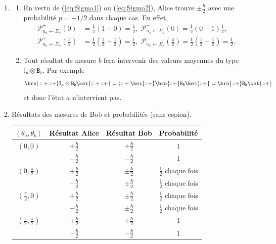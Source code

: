 \begin{enumerate}
\begin{enumerate}
\item 
\begin{enumerate}
 \item En vertu de (\ref{eq:Sigma1}) ou (\ref{eq:Sigma2}), Alice trouve
$\pm\frac{\hbar}{2}$ avec une probabilité $p=+1/2$ dans chaque cas. En effet,
\begin{align}
 \mathcal{P}^{+}_{u_a\leftarrow\Sigma_a}(0) & =\frac{1}{2}(1+0)=\frac{1}{2},\,\,
 \mathcal{P}^{-}_{u_a\leftarrow\Sigma_a}(0)=\frac{1}{2}(0+1)\frac{1}{2},\\
 \mathcal{P}^{+}_{u_a\leftarrow\Sigma_a}(\frac{\pi}{2}) & 
=\frac{1}{2}(\frac{1}{2}+\frac{1}{2})=\frac{1}{2},\,\,
\mathcal{P}^{-}_{u_a\leftarrow\Sigma_a}(\frac{\pi}{2})=\frac{1}{2}(\frac{1}{2}
+\frac{1}{2})=\frac{1}{2}.
\end{align}

\item Tout résultat de mesure $b$ fera intervenir des valeurs moyennes du type
$\mathbb{I}_a\otimes\mathtt{B}_b$. Par exemple
\begin{equation}
  \bra{z+z+}\mathbb{I}_a\otimes\mathtt{B}_b\ket{z+z+} =\langle z+\ket{z+} 
\bra{z+}\mathtt{B}_b\ket{z+}=\bra{z+}\mathtt{B}_b\ket{z+}
\end{equation}
et donc l'état $a$ n'intervient pas.
\end{enumerate}

\item Résultats des mesures de Bob et probabilités (sans espion).
\begin{center}
\begin{tabular}{|c|c|c|c|}\hline
$(\theta_a,\theta_b)$ & Résultat Alice & Résultat Bob & Probabilité\\\hline
$(0,0)$ & $+\frac{\hbar}{2}$ & $+\frac{\hbar}{2}$ & $1$\\\cline{2-4}
 & $-\frac{\hbar}{2}$ & $-\frac{\hbar}{2}$ & $1$\\\hline
$(0,\frac{\pi}{2})$ & $+\frac{\hbar}{2}$ & $\pm\frac{\hbar}{2}$ & 
$\frac{1}{2}$ chaque fois\\\cline{2-4}
 & $-\frac{\hbar}{2}$ & $\pm\frac{\hbar}{2}$ & $\frac{1}{2}$ chaque fois\\\hline
$(\frac{\pi}{2},0)$ & $+\frac{\hbar}{2}$ & $\pm\frac{\hbar}{2}$ & 
$\frac{1}{2}$ chaque fois\\\cline{2-4}
 & $-\frac{\hbar}{2}$ & $\pm\frac{\hbar}{2}$ & $\frac{1}{2}$ chaque fois\\\hline
$(\frac{\pi}{2},\frac{\pi}{2})$ & $+\frac{\hbar}{2}$ & $+\frac{\hbar}{2}$ & 
$1$\\\cline{2-4}
 & $-\frac{\hbar}{2}$ & $-\frac{\hbar}{2}$ & $1$\\\hline
\end{tabular}
\end{center}


\end{enumerate}
\end{enumerate}
